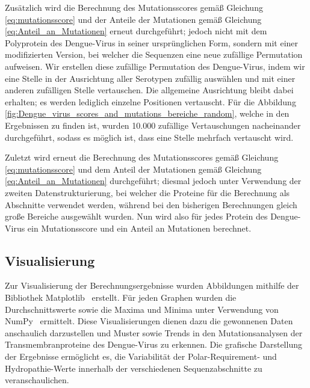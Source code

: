 \documentclass[german,version-2022-01]{uzl-thesis}
\begin{document}
Zus\"atzlich wird die Berechnung des Mutationsscores gem\"a\ss{} Gleichung \ref{eq:mutationsscore} und der Anteile der Mutationen gem\"a\ss{} Gleichung \ref{eq:Anteil_an_Mutationen} erneut durchgef\"uhrt; jedoch nicht mit dem Polyprotein des Dengue-Virus in seiner urspr\"unglichen Form, sondern mit einer modifizierten Version, bei welcher die Sequenzen eine neue zuf\"allige Permutation aufweisen. Wir erstellen diese zuf\"allige Permutation des Dengue-Virus, indem wir eine Stelle in der Ausrichtung aller Serotypen zuf\"allig ausw\"ahlen und mit einer anderen zuf\"alligen Stelle vertauschen. Die allgemeine Ausrichtung bleibt dabei erhalten; es werden lediglich einzelne Positionen vertauscht. F\"ur die Abbildung \ref{fig:Dengue_virus_scores_and_mutations_bereiche_random}, welche in den Ergebnissen zu finden ist, wurden 10.000 zuf\"allige Vertauschungen nacheinander durchgef\"uhrt, sodass es m\"oglich ist, dass eine Stelle mehrfach vertauscht wird.

Zuletzt wird erneut die Berechnung des Mutationsscores gem\"a\ss{} Gleichung \ref{eq:mutationsscore} und dem Anteil der Mutationen gem\"a\ss{} Gleichung \ref{eq:Anteil_an_Mutationen} durchgef\"uhrt; diesmal jedoch unter Verwendung der zweiten Datenstrukturierung, bei welcher die Proteine f\"ur die Berechnung als Abschnitte verwendet werden, w\"ahrend bei den bisherigen Berechnungen gleich gro\ss{}e Bereiche ausgew\"ahlt wurden. Nun wird also f\"ur jedes Protein des Dengue-Virus ein Mutationsscore und ein Anteil an Mutationen berechnet.

\subsection{Visualisierung}
Zur Visualisierung der Berechnungsergebnisse wurden Abbildungen mithilfe der Bibliothek Matplotlib~\cite{matplotlib} erstellt. F\"ur jeden Graphen wurden die Durchschnittswerte sowie die Maxima und Minima unter Verwendung von NumPy~\cite{numpy} ermittelt. Diese Visualisierungen dienen dazu die gewonnenen Daten anschaulich darzustellen und Muster sowie Trends in den Mutationsanalysen der Transmembranproteine des Dengue-Virus zu erkennen. Die grafische Darstellung der Ergebnisse erm\"oglicht es, die Variabilit\"at der Polar-Requirement- und Hydropathie-Werte innerhalb der verschiedenen Sequenzabschnitte zu veranschaulichen.
\end{document}
